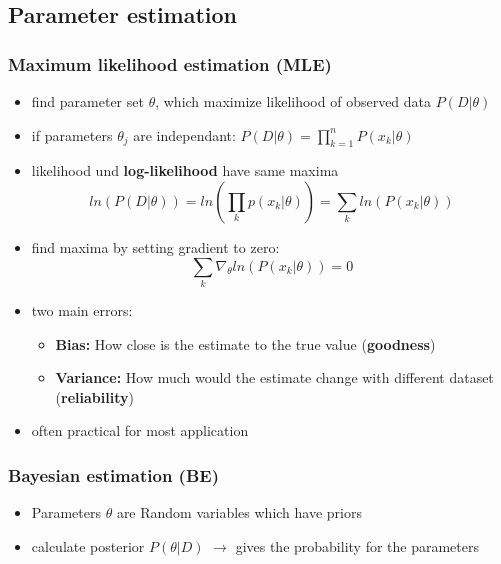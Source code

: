 \documentclass[11pt]{article}
\begin{document}
\subsection{Parameter estimation}
\label{sec-9-3}
\subsubsection{Maximum likelihood estimation (MLE)}
\label{sec-9-3-1}
\begin{itemize}
\item find parameter set $\theta$, which maximize likelihood of observed data $P(D|\theta)$
\item if parameters $\theta_j$ are independant: $P(D|\theta) = \prod_{k=1}^n P(x_k|\theta)$
\item likelihood und \textbf{log-likelihood} have same maxima
      \[ ln(P(D|\theta))=ln(\prod_k p(x_k|\theta)) = \sum_k ln(P(x_k|\theta)) \]
\item find maxima by setting gradient to zero:
      \[ \sum_k \nabla_\theta ln(P(x_k|\theta))=0 \]
\item two main errors:
\begin{itemize}
\item \textbf{Bias:} How close is the estimate to the true value (\textbf{goodness})
\item \textbf{Variance:} How much would the estimate change with different dataset (\textbf{reliability})
\end{itemize}
\item often practical for most application
\end{itemize}
\subsubsection{Bayesian estimation (BE)}
\label{sec-9-3-2}
\begin{itemize}
\item Parameters $\theta$ are Random variables which have priors
\item calculate posterior $P(\theta|D)$ $\rightarrow$ gives the probability for the parameters
\end{itemize}
\end{document}
